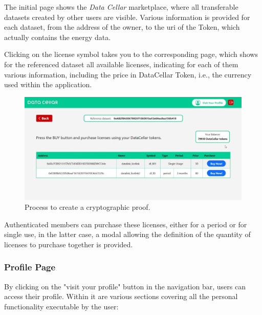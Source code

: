 The initial page shows the \textit{Data Cellar} marketplace, where all transferable datasets created by other users are visible. Various information is provided for each dataset, 
from the address of the owner, to the \gls{uri} of the Token, which actually contains the energy data.

Clicking on the license symbol takes you to the corresponding page, which shows for the referenced dataset all available licenses, indicating for each of them various 
information, including the price in DataCellar Token, i.e., the currency used within the application. 

\begin{figure}[h]  
  \centering
  \includegraphics[width=1\textwidth]{Images/c6_5.jpg} 
  \caption{Process to create a cryptographic proof.}
\end{figure}

Authenticated members can purchase these licenses, either for a period or for single use, in the latter case, a modal allowing the definition of the quantity of licenses to
purchase together is provided.

\subsubsection{Profile Page}

By clicking on the "visit your profile" button in the navigation bar, users can access their profile. Within it are various sections covering all the personal functionality 
executable by the user:

\newpage

